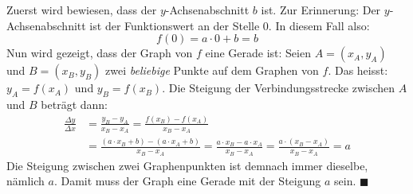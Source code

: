 \begin{prf}
    Zuerst wird bewiesen, dass der $y$-Achsen\-abschnitt $b$ ist. Zur Erinnerung: Der $y$-Achsen\-abschnitt ist der Funktionswert an der Stelle $0$. In diesem Fall also:
    \[f(0) = a \cdot 0 + b = b\]
    Nun wird gezeigt, dass der Graph von $f$ eine Gerade ist: Seien $A = (x_{A},y_{A})$ und $B = (x_{B},y_{B})$ zwei \textit{beliebige} Punkte auf dem Graphen von $f$. Das heisst: $y_{A} = f(x_{A})$ und $y_{B} = f(x_{B})$. Die Steigung der Verbindungsstrecke zwischen $A$ und $B$ beträgt dann:
    \begin{align*}
        \frac{\Delta y}{\Delta x} & = \frac{y_{B} - y_{A}}{x_{B} - x_{A}} = \frac{f(x_{B}) - f(x_{A})}{x_{B} - x_{A}}                                                                             \\[1mm]
                                  & = \frac{(a \cdot x_{B} + b) - (a \cdot x_{A} + b)}{x_{B} - x_{A}} = \frac{a \cdot x_{B} - a \cdot x_{A}}{x_{B} - x_{A}} = \frac{a \cdot (x_{B} - x_{A})}{x_{B} - x_{A}} = a
    \end{align*}
    Die Steigung zwischen zwei Graphenpunkten ist demnach immer dieselbe, nämlich $a$. Damit muss der Graph eine Gerade mit der Steigung $a$ sein. \hfill $\blacksquare$
\end{prf}
\newpage

